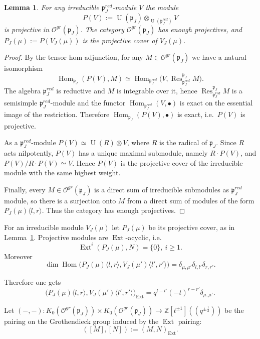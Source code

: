 \documentclass[10pt]{amsart}
\newcommand{\sh}[2]{\langle #1,#2\rangle}
\newtheorem{lemma}[theorem]{Lemma}
\newcommand{\fp}{{\mathfrak p}}
\DeclareMathOperator{\Res}{Res}
\DeclareMathOperator{\Hom}{Hom}
\DeclareMathOperator{\U}{U}
\DeclareMathOperator{\Ext}{Ext}
\begin{document}
	\begin{lemma}\label{lem:Projectivity}
		For any irreducible $\fp_J^{red}$-module $V$ the module
		\[P(V):=\U(\fp_J)\otimes_{\U(\fp_J^{red})}V\]
		is projective in $\mathcal{O}^{gr}(\fp_J)$. The category $\mathcal{O}^{gr}(\fp_J)$ has enough projectives, and $P_J(\mu):=P(V_J(\mu))$ is the projective cover of $V_J(\mu)$.
	\end{lemma}
	\begin{proof}
		By the tensor-hom adjunction, for any $M \in \mathcal{O}^{gr}(\fp_J)$ we have a natural isomorphism
		\[\Hom_{\fp_J}(P(V),M)\simeq \Hom_{\fp_J^{red}}\bigl(V,\Res^{\fp_J}_{\fp_J^{red}}M\bigr).\]
		The algebra $\fp_J^{red}$ is reductive and $M$ is integrable over it, hence $\Res^{\fp_J}_{\fp_J^{red}}M$ is a semisimple $\fp_J^{red}$-module and the functor $\Hom_{\fp_J^{red}}(V,\bullet)$ is exact on the essential image of the restriction. Therefore $\Hom_{\fp_J}(P(V),\bullet)$ is exact, i.e.\ $P(V)$ is projective.
		
		As a $\fp_J^{red}$-module $P(V)\simeq \U(R)\otimes V$, where $R$ is the radical of $\fp_J$. Since $R$ acts nilpotently, $P(V)$ has a unique maximal submodule, namely $R\cdot P(V)$, and $P(V)/R\cdot P(V)\simeq V$. Hence $P(V)$ is the projective cover of the irreducible module with the same highest weight.
		
		Finally, every $M \in \mathcal{O}^{gr}(\fp_J)$ is a direct sum of irreducible submodules as $\fp_J^{red}$ module, so there is a surjection onto $M$ from a direct sum of modules of the form $P_J(\mu)\sh{l}{r}$. Thus the category has enough projectives.
	\end{proof}
	
	For an irreducible module $V_{J}(\mu)$ let $P_{J}(\mu)$ be its projective cover, as in Lemma~\ref{lem:Projectivity}. Projective modules are $\Ext$-acyclic, i.e.\
	\[\Ext^{i}(P_{J}(\mu) ,N)=\{0\},~ i \geq 1.\]
	Moreover
	\[\dim \Hom\bigl(P_{J}(\mu)\sh{l}{r},V_{J}(\mu')\sh{l'}{r'} \bigr)=\delta_{\mu,\mu'}\delta_{l,l'}\delta_{r,r'}.\]
	
	Therefore one gets
	\begin{equation*}
		\bigl(P_{J}(\mu)\sh{l}{r},V_{J}(\mu')\sh{l'}{r'}\bigr)_{\Ext} =q^{l-l'}(-t)^{r-r'}\delta_{\mu,\mu'}.
	\end{equation*}
	
	Let $(-,-): K_0( \mathcal{O}^{gr}(\fp_{J}))\times K_0( \mathcal{O}^{gr}(\fp_{J})) \rightarrow \mathbb{Z}[t^{\pm 1}]((q^{\pm \frac{1}{2}}))$ be the pairing on the Grothendieck group induced by the $\Ext$ pairing:
	\begin{equation*}
		([M],[N]):=(M,N)_{\Ext}.
	\end{equation*}
	
\end{document}
